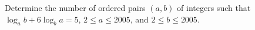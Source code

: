 Determine the number of ordered pairs $(a,b)$ of integers such that $\log_a b + 6\log_b a=5$, $2 \leq a \leq 2005$, and $2 \leq b \leq 2005$.